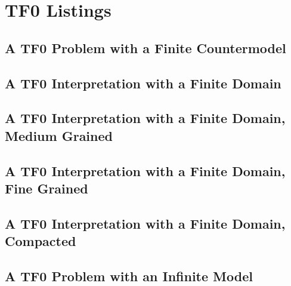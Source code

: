 \documentclass{easychair}
\begin{document}
\section{TF0 Listings}
\label{TF0Listings}

\subsection{A TF0 Problem with a Finite Countermodel}
\begin{small}

\end{small}

\newpage
\subsection{A TF0 Interpretation with a Finite Domain}
\begin{small}

\end{small}

\newpage
\subsection{A TF0 Interpretation with a Finite Domain, Medium Grained}
\begin{small}

\end{small}

\newpage
\subsection{A TF0 Interpretation with a Finite Domain, Fine Grained}
\begin{small}

\end{small}

\newpage
\subsection{A TF0 Interpretation with a Finite Domain, Compacted}
\begin{small}

\end{small}

\newpage
\subsection{A TF0 Problem with an Infinite Model}
\begin{small}

\end{small}
\end{document}

